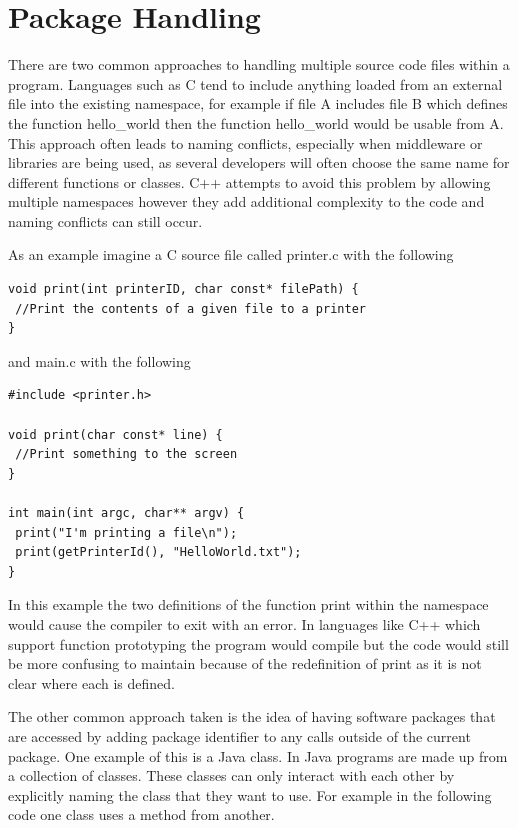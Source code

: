 \documentclass[]{final_report}
\begin{document}
\chapter{Package Handling}

There are two common approaches to handling multiple source code files within a program. Languages such as C tend to include anything loaded from an external file into the existing namespace, for example if file A includes file B which defines the function hello\_world then the function hello\_world would be usable from A. This approach often leads to naming conflicts, especially when middleware or libraries are being used, as several developers will often choose the same name for different functions or classes. C++ attempts to avoid this problem by allowing multiple namespaces however they add additional complexity to the code and naming conflicts can still occur.

As an example imagine a C source file called printer.c with the following

\begin{verbatim}
void print(int printerID, char const* filePath) {
 //Print the contents of a given file to a printer
}
\end{verbatim}

and main.c with the following
\begin{verbatim}
#include <printer.h>

void print(char const* line) {
 //Print something to the screen
}

int main(int argc, char** argv) {
 print("I'm printing a file\n");
 print(getPrinterId(), "HelloWorld.txt");
}
\end{verbatim}

In this example the two definitions of the function print within the namespace would cause the compiler to exit with an error. In languages like C++ which support function prototyping the program would compile but the code would still be more confusing to maintain because of the redefinition of print as it is not clear where each is defined.

The other common approach taken is the idea of having software packages that are accessed by adding  package identifier to any calls outside of the current package. One example of this is a Java class. In Java programs are made up from a collection of classes. These classes can only interact with each other by explicitly naming the class that they want to use. For example in the following code one class uses a method from another.
\end{document}
